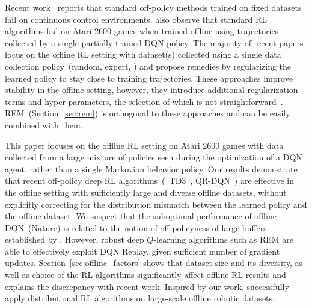 Recent work~\citep{fujimoto2018off, kumar2019stabilizing,
wu2019behavior, siegel2020keep} reports that standard off-policy
methods trained on fixed datasets fail on continuous control
environments. \citet{fujimoto2019benchmarking} also observe that
standard RL algorithms fail on Atari 2600 games when trained offline using
trajectories collected by a single partially-trained DQN policy. The
majority of recent papers focus on the offline RL setting with
dataset(s) collected using a single data collection policy~(\eg random,
expert, \etc) and propose remedies by regularizing the learned policy
to stay close to training trajectories. These approaches improve
stability in the offline setting, however, they introduce additional
regularization terms and hyper-parameters, the selection of which is
not straightforward~\citep{wu2019behavior}. REM~(Section~\ref{sec:rem}) is
orthogonal to these approaches and can be easily combined with them.



This paper focuses on the offline RL setting on Atari 2600 games with
data collected from a large mixture of policies seen during the
optimization of a DQN agent, rather than a single Markovian behavior
policy. Our results
demonstrate that recent
off-policy deep RL algorithms~(\eg~TD3~\citep{fujimoto2018addressing},
QR-DQN~\citep{dabney2018distributional}) are effective in the offline
setting with sufficiently large and diverse offline datasets, without
explicitly correcting for the distribution
mismatch between the learned policy and the offline
dataset. 
We suspect that the suboptimal
performance of offline DQN~(Nature) is related to the
notion of off-policyness of large buffers established
by \citet{Zhang2017ADL}. However, robust deep $Q$-learning algorithms
such as REM are able to effectively exploit DQN Replay, given
sufficient number of gradient updates. 
Section~\ref{sec:offline_factors} shows that dataset size and its diversity, as well as choice of the RL algorithms significantly affect offline RL results and explains the discrepancy with recent work. 
Inspired by our work, \citet{cabi2019framework}
successfully apply distributional RL algorithms on large-scale offline robotic datasets. 


